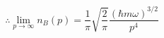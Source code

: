 \documentclass[onecolumn,english,aps,pra]{revtex4}
\begin{document}
\begin{equation}
\therefore \lim_{p \rightarrow \infty} n_{B}(p) = \dfrac{1}{\pi} \sqrt{\dfrac{2}{\pi}} \dfrac{(\hbar m \omega)^{3/2}}{p^4}
\end{equation}

	
\end{document}

